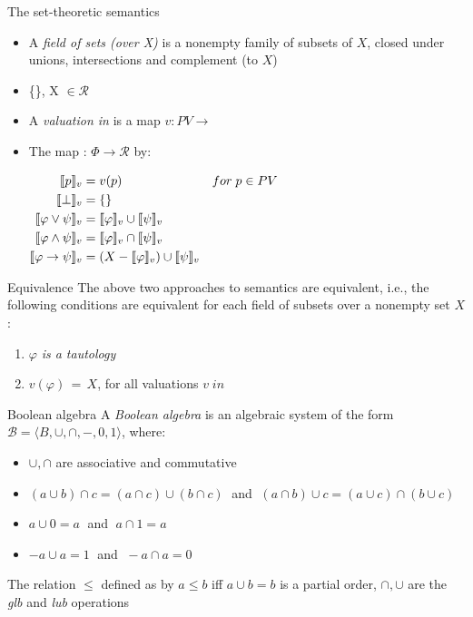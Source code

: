 \documentclass[sans]{beamer}
\begin{document}
\begin{frame}{The set-theoretic semantics}
  \begin{itemize}
    \item A \emph{field of sets (over X)} is a nonempty family \calr
      of subsets of $X$, closed under unions, intersections and complement (to $X$)
    
    \item \{\}, X $\in \mathcal{R}$
    
    \item A \emph{valuation in} \calr is a map $v: PV \to$ \calr
      
    \vfill

    \item The map \vmsem{\bullet} : $\Phi \to \mathcal{R}$ by:

      $\begin{aligned}
        \llbracket p \rrbracket_v &= v(p) & for \; p \in PV \\
        \llbracket \bot \rrbracket_v &= \{\} \\
        \llbracket \varphi \vee \psi \rrbracket_v &= \llbracket \varphi \rrbracket_v \cup \llbracket \psi \rrbracket_v \\
        \llbracket \varphi \wedge \psi \rrbracket_v &= \llbracket \varphi \rrbracket_v \cap \llbracket \psi \rrbracket_v\\
        \llbracket \varphi \to \psi \rrbracket_v &= (X - \llbracket \varphi \rrbracket_v) \cup \llbracket \psi \rrbracket_v
       \end{aligned}$
  \end{itemize}
\end{frame}

\begin{frame}{Equivalence}
  The above two approaches to semantics are equivalent, i.e., the following conditions
  are equivalent for each field of subsets \calr over a nonempty set $X$:
  \begin{enumerate}
    \item $\varphi$ \emph{is a tautology}
    \item $v(\varphi) \,=\, X$, for all valuations $v \; in \; $\calr
  \end{enumerate}
\end{frame}

\begin{frame}{Boolean algebra}
  A \emph{Boolean algebra} is an algebraic system of the form
  $\mathcal{B} = \langle B, \cup, \cap, -, 0, 1\rangle$, where:
  \begin{itemize}
    \item $\cup, \cap$ are associative and commutative
    \item $(a \cup b) \cap c = (a \cap c) \cup (b \cap c) \;$ and
          $\; (a \cap b) \cup c = (a \cup c) \cap (b \cup c)$
    \item $a \cup 0 = a \;$ and $\; a \cap 1 = a$
    \item $-a \cup a = 1 \;$ and $\; -a \cap a = 0\;$
  \end{itemize}

  \vfill
  
  The relation $\leq$ defined as by $a \leq b$ iff $a \cup b = b$ is a partial order,
  $\cap, \cup$ are the \emph{glb} and \emph{lub} operations
\end{frame} 
\end{document}
